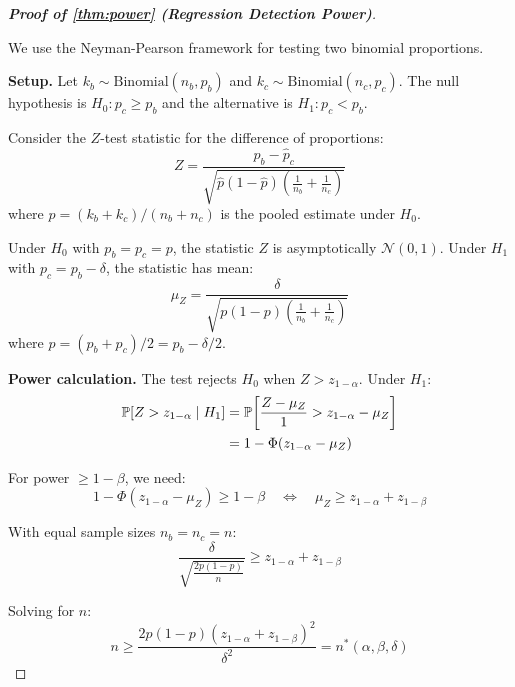 \begin{proof}[\textbf{Proof of \cref{thm:power} (Regression Detection Power)}]
\label{app:proof:power}

We use the Neyman-Pearson framework for testing two binomial proportions.

\textbf{Setup.} Let $k_b \sim \text{Binomial}(n_b, p_b)$ and
$k_c \sim \text{Binomial}(n_c, p_c)$. The null hypothesis is
$H_0: p_c \geq p_b$ and the alternative is $H_1: p_c < p_b$.

Consider the $Z$-test statistic for the difference of proportions:
\begin{equation}
  Z = \frac{\hat{p}_b - \hat{p}_c}
    {\sqrt{\hat{p}(1-\hat{p})\left(\frac{1}{n_b} + \frac{1}{n_c}\right)}}
\end{equation}
where $\hat{p} = (k_b + k_c) / (n_b + n_c)$ is the pooled estimate
under $H_0$.

Under $H_0$ with $p_b = p_c = p$, the statistic $Z$ is asymptotically
$\mathcal{N}(0, 1)$. Under $H_1$ with $p_c = p_b - \delta$, the
statistic has mean:
\begin{equation}
  \mu_Z = \frac{\delta}
    {\sqrt{p(1-p)\left(\frac{1}{n_b} + \frac{1}{n_c}\right)}}
\end{equation}
where $p = (p_b + p_c) / 2 = p_b - \delta/2$.

\textbf{Power calculation.} The test rejects $H_0$ when $Z > z_{1-\alpha}$.
Under $H_1$:
\begin{align}
  \Pr[Z > z_{1-\alpha} \mid H_1]
  &= \Pr\!\left[\frac{Z - \mu_Z}{\mathstrut 1} > z_{1-\alpha} - \mu_Z\right] \\
  &= 1 - \Phi(z_{1-\alpha} - \mu_Z)
\end{align}

For power $\geq 1-\beta$, we need:
\begin{equation}
  1 - \Phi(z_{1-\alpha} - \mu_Z) \geq 1 - \beta
  \quad\Leftrightarrow\quad
  \mu_Z \geq z_{1-\alpha} + z_{1-\beta}
\end{equation}

With equal sample sizes $n_b = n_c = n$:
\begin{equation}
  \frac{\delta}{\sqrt{\frac{2p(1-p)}{n}}} \geq z_{1-\alpha} + z_{1-\beta}
\end{equation}

Solving for $n$:
\begin{equation}
  n \geq \frac{2p(1-p)(z_{1-\alpha} + z_{1-\beta})^2}{\delta^2}
  = n^*(\alpha, \beta, \delta)
\end{equation}


\end{proof}

